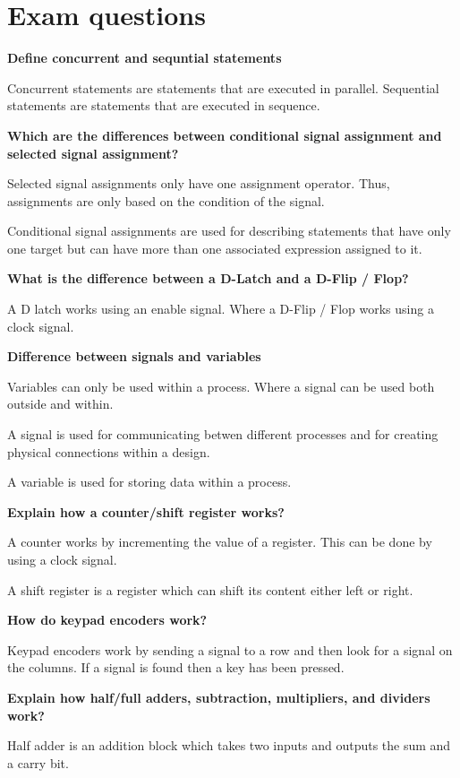 \section{Exam questions}

\textbf{Define concurrent and sequntial statements}

Concurrent statements are statements that are executed in parallel.
Sequential statements are statements that are executed in sequence.


\textbf{Which are the differences between conditional signal assignment and selected signal assignment?}

Selected signal assignments only have one assignment operator.
Thus, assignments are only based on the condition of the signal.

Conditional signal assignments are used for describing
statements that have only one target but can have more than
one associated expression assigned to it.



\textbf{What is the difference between a D-Latch and a D-Flip / Flop?}

A D latch works using an enable signal.
Where a D-Flip / Flop works using a clock signal.


\textbf{Difference between signals and variables}

Variables can only be used within a process. Where a signal
can be used both outside and within.

A signal is used for communicating betwen different processes
and for creating physical connections within a design.

A variable is used for storing data within a process.


\textbf{Explain how a counter/shift register works?}

A counter works by incrementing the value of a register.
This can be done by using a clock signal.

A shift register is a register which can shift its content
either left or right.


\textbf{How do keypad encoders work?}

Keypad encoders work by sending a signal to a row and then
look for a signal on the columns. If a signal is found
then a key has been pressed.


\textbf{Explain how half/full adders, subtraction, multipliers, and dividers work?}

Half adder is an addition block which takes two inputs and outputs
the sum and a carry bit.

